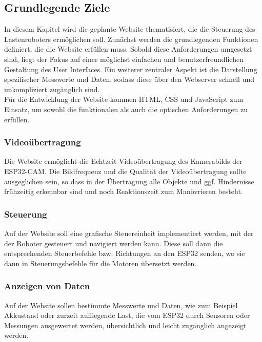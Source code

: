 \documentclass[ngerman,12pt,a4paper]{article}
\begin{document}
		\subsection{Grundlegende Ziele}
	In diesem Kapitel wird die geplante Website thematisiert, die die Steuerung des Lastenroboters ermöglichen soll. Zunächst werden die grundlegenden Funktionen definiert, die die Website erfüllen muss. Sobald diese Anforderungen umgesetzt sind, liegt der Fokus auf einer möglichst einfachen und benutzerfreundlichen Gestaltung des User Interfaces. Ein weiterer zentraler Aspekt ist die Darstellung spezifischer Messwerte und Daten, sodass diese über den Webserver schnell und unkompliziert zugänglich sind. \\[0.5cm]
	Für die Entwicklung der Website kommen HTML, CSS und JavaScript zum Einsatz, um sowohl die funktionalen als auch die optischen Anforderungen zu erfüllen. 
	
			\subsubsection*{Videoübertragung} 	 
	
	Die Website ermöglicht die Echtzeit-Videoübertragung des Kamerabilds der ESP32-CAM. Die Bildfrequenz und die Qualität der Videoübertragung sollte ausgeglichen sein, so dass in der Übertragung alle Objekte und ggf. Hindernisse frühzeitig erkennbar sind und noch Reaktionszeit zum Manövrieren besteht. 
	
			\subsubsection*{Steuerung}
	
	Auf der Website soll eine grafische Steuereinheit implementiert werden, mit der der Roboter gesteuert und navigiert werden kann. Diese soll dann die entsprechenden Steuerbefehle bzw. Richtungen an den ESP32 senden, wo sie dann in Steuerungsbefehle für die Motoren übersetzt werden.  
	
			\subsubsection*{Anzeigen von Daten}
	
	Auf der Website sollen bestimmte Messwerte und Daten, wie zum Beispiel Akkustand oder zurzeit aufliegende Last, die vom ESP32 durch Sensoren oder Messungen ausgewertet werden, übersichtlich und leicht zugänglich angezeigt werden. \newpage
		
\end{document}
